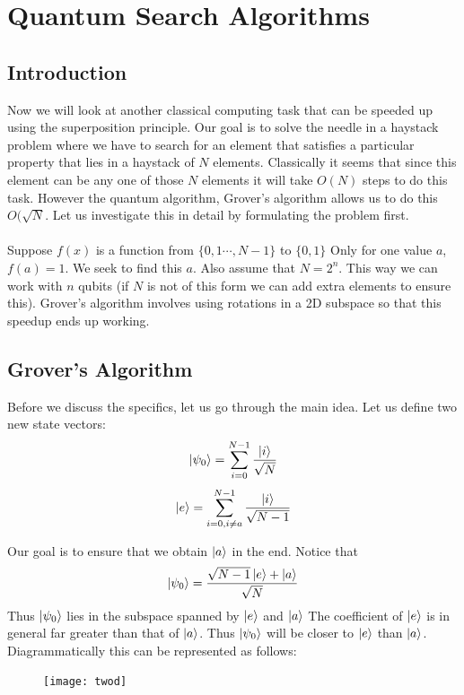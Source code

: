 \chapter{Quantum Search Algorithms}

\section{Introduction}
Now we will look at another classical computing task that can be speeded up using the superposition principle. Our goal is to solve the needle in a haystack problem where we have to search for an element that satisfies a particular property that lies in a haystack of $N$ elements. Classically it seems that since this element can be any one of those $N$ elements it will take $O(N)$ steps to do this task. However the quantum algorithm, Grover's algorithm allows us to do this $O(\sqrt{N}$. Let us investigate this in detail by formulating the problem first.
\\\\
Suppose $f(x)$ is a function from $\{0, 1 \cdots, N-1\}$ to $\{0, 1\}$ Only for one value $a$, $f(a) = 1$. We seek to find this $a$. Also assume that $N = 2^n$. This way we can work with $n$ qubits (if $N$ is not of this form we can add extra elements to ensure this). Grover's algorithm involves using rotations in a 2D subspace so that this speedup ends up working.

\section{Grover's Algorithm}

Before we discuss the specifics, let us go through the main idea. Let us define two new state vectors:
$$\ket{\psi_0} = \sum_{i=0}^{N - 1} \frac{\ket{i}}{\sqrt{N}}$$ 
$$\ket{e} = \sum_{i = 0, i \neq a}^{N-1} \frac{\ket{i}}{\sqrt{N-1}}$$

Our goal is to ensure that we obtain $\ket{a}$ in the end. Notice that $$\ket{\psi_0} = \frac{\sqrt{N-1}\ket{e} + \ket{a}}{\sqrt{N}}$$ Thus $\ket{\psi_0}$ lies in the subspace spanned by $\ket{e}$ and $\ket{a}$ The coefficient of $\ket{e}$ is in general far greater than that of $\ket{a}$. Thus $\ket{\psi_0}$ will be closer to $\ket{e}$ than $\ket{a}$. Diagrammatically this can be represented as follows:
\begin{figure}[htp]
    \centering
    \texttt{[image: twod]}
\end{figure}

